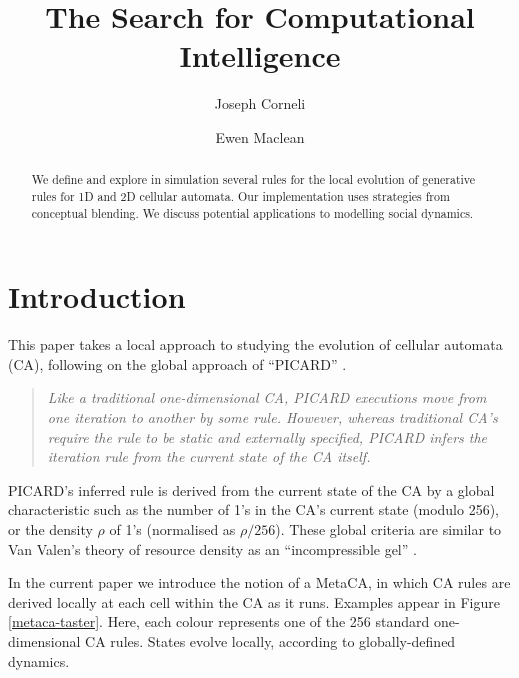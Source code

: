 \documentclass{AISB2008}
\newcommand*{\sourceatright}[1]{\unskip\hspace{1em plus 1fill}%
\nolinebreak[3]\hspace*{\fill}\mbox{#1}}%
\begin{document}
\title{The Search for Computational Intelligence}

\author{Joseph Corneli
\and
Ewen Maclean
}

\maketitle


\begin{abstract}
We define and explore in simulation several rules for the local
evolution of generative rules for 1D and 2D cellular automata.  Our
implementation uses strategies from conceptual blending.  We discuss
potential applications to modelling social dynamics.
\end{abstract}

\section{Introduction}

This paper takes a local approach to studying the evolution of
cellular automata (CA), following on the global approach of
``PICARD'' \cite{pavlic2014self}.

\begin{quote}
\emph{Like a traditional one-dimensional CA, PICARD executions move
  from one iteration to another by some rule. However, whereas
  traditional CA's require the rule to be static and externally
  specified, PICARD infers the iteration rule from the current state
  of the CA itself.}
\sourceatright{\cite[pp. 1--2]{pavlic2014self}}
\end{quote}

PICARD's inferred rule is derived from the current state of the CA by
a global characteristic such as the number of 1's in the CA's
current state (modulo 256), or the density $\rho$ of 1's (normalised
as $\rho/256$).  These global criteria are similar to Van Valen's
theory of resource density as an ``incompressible gel'' \cite{van1973new}.

In the current paper we introduce the notion of a MetaCA, in which CA
rules are derived locally at each cell within the CA as it runs.
Examples appear in Figure \ref{metaca-taster}.  Here, each colour
represents one of the 256 standard one-dimensional CA rules.  States
evolve locally, according to globally-defined dynamics.
\end{document}
